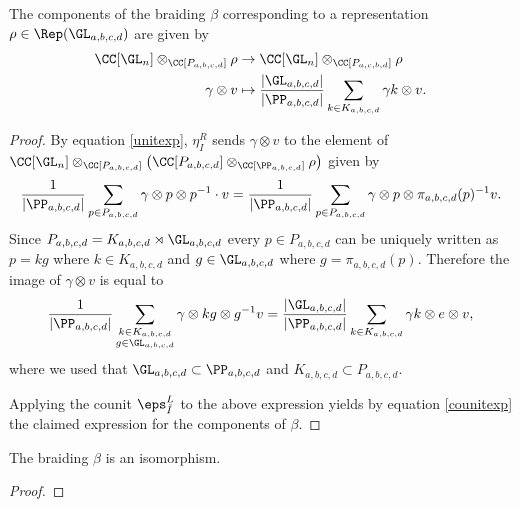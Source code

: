 \begin{Lemma}
The components of the braiding $\beta$ corresponding to a representation $\rho \in \Rep(\GL_{a,b,c,d})$ are given by
\begin{align}
\CC[\GL_n]\otimes_{\CC[P_{a,b,c,d}]} \rho &\to \CC[\GL_n] \otimes_{\CC[P_{a,c,b,d}]} \rho \\ \nonumber
\gamma \otimes v &\mapsto \frac{\left|\GL_{a,b,c,d}\right|}{\left| \PP_{a,b,c,d} \right|} \sum_{k \in K_{a,b,c,d}} \gamma k \otimes v. \nonumber
\end{align}
\end{Lemma}
\begin{proof}
By equation \eqref{unitexp}, $\eta^R_I$ sends $\gamma \otimes v$ to the element of $\CC[\GL_n] \otimes_{\CC[P_{a,b,c,d}]} \left( \CC[P_{a,b,c,d}] \otimes_{\CC[\PP_{a,b,c,d}]} \rho\right)$  given by %
\begin{equation*}
\frac{1}{\left| \PP_{a,b,c,d} \right|} \sum_{p \in P_{a,b,c,d}}\gamma \otimes p \otimes p^{-1} \cdot v = \frac{1}{\left| \PP_{a,b,c,d} \right|} \sum_{p \in P_{a,b,c,d}}\gamma \otimes p \otimes \pi_{a,b,c,d}(p)^{-1} v.
\end{equation*}
Since $P_{a,b,c,d} = K_{a,b,c,d} \rtimes \GL_{a,b,c,d}$ every $p \in P_{a,b,c,d}$ can be uniquely written as $p=k g$ where $k \in K_{a,b,c,d}$ and $g \in \GL_{a,b,c,d}$ where $g = \pi_{a,b,c,d}(p)$. Therefore the image of $\gamma \otimes v$ is equal to
\begin{equation*}
 \frac{1}{\left| \PP_{a,b,c,d} \right|} \sum_{\substack{ k \in K_{a,b,c,d} \\ g \in \GL_{a,b,c,d}
 }}\gamma \otimes k g \otimes g^{-1} v = \frac{\left|\GL_{a,b,c,d}\right|}{\left| \PP_{a,b,c,d} \right|} \sum_{k \in K_{a,b,c,d}} \gamma k \otimes e \otimes v,
\end{equation*}
where we used that $\GL_{a,b,c,d} \subset \PP_{a,b,c,d}$ and $K_{a,b,c,d} \subset P_{a,b,c,d}$.

Applying the counit $\eps^L_{\tilde{I}}$ to the above expression yields by equation \eqref{counitexp} the claimed expression for the components of $\beta$.
\end{proof} 

\begin{Theorem}
The braiding $\beta$ is an isomorphism.
\end{Theorem}
\begin{proof}

\end{proof}